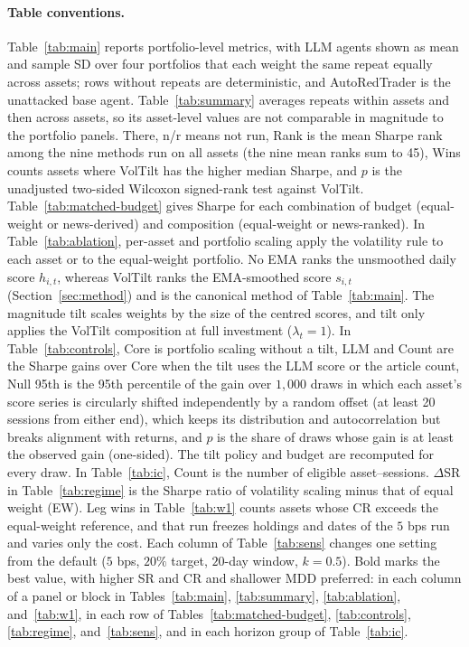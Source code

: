 \paragraph{Table conventions.}
Table~\ref{tab:main} reports portfolio-level metrics, with LLM agents shown as mean and sample SD over four portfolios that each weight the same repeat equally across assets; rows without repeats are deterministic, and AutoRedTrader is the unattacked base agent. Table~\ref{tab:summary} averages repeats within assets and then across assets, so its asset-level values are not comparable in magnitude to the portfolio panels. There, n/r means not run, Rank is the mean Sharpe rank among the nine methods run on all assets (the nine mean ranks sum to 45), Wins counts assets where VolTilt has the higher median Sharpe, and $p$ is the unadjusted two-sided Wilcoxon signed-rank test against VolTilt. Table~\ref{tab:matched-budget} gives Sharpe for each combination of budget (equal-weight or news-derived) and composition (equal-weight or news-ranked). In Table~\ref{tab:ablation}, per-asset and portfolio scaling apply the volatility rule to each asset or to the equal-weight portfolio. No EMA ranks the unsmoothed daily score $h_{i,t}$, whereas VolTilt ranks the EMA-smoothed score $s_{i,t}$ (Section~\ref{sec:method}) and is the canonical method of Table~\ref{tab:main}. The magnitude tilt scales weights by the size of the centred scores, and tilt only applies the VolTilt composition at full investment ($\lambda_t=1$). In Table~\ref{tab:controls}, Core is portfolio scaling without a tilt, LLM and Count are the Sharpe gains over Core when the tilt uses the LLM score or the article count, Null 95th is the 95th percentile of the gain over $1{,}000$ draws in which each asset's score series is circularly shifted independently by a random offset (at least 20 sessions from either end), which keeps its distribution and autocorrelation but breaks alignment with returns, and $p$ is the share of draws whose gain is at least the observed gain (one-sided). The tilt policy and budget are recomputed for every draw. In Table~\ref{tab:ic}, Count is the number of eligible asset--sessions. $\Delta$SR in Table~\ref{tab:regime} is the Sharpe ratio of volatility scaling minus that of equal weight (EW). Leg wins in Table~\ref{tab:w1} counts assets whose CR exceeds the equal-weight reference, and that run freezes holdings and dates of the $5$ bps run and varies only the cost. Each column of Table~\ref{tab:sens} changes one setting from the default ($5$ bps, $20\%$ target, $20$-day window, $k=0.5$). Bold marks the best value, with higher SR and CR and shallower MDD preferred: in each column of a panel or block in Tables~\ref{tab:main}, \ref{tab:summary}, \ref{tab:ablation}, and~\ref{tab:w1}, in each row of Tables~\ref{tab:matched-budget}, \ref{tab:controls}, \ref{tab:regime}, and~\ref{tab:sens}, and in each horizon group of Table~\ref{tab:ic}.

